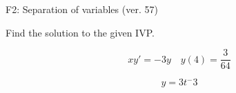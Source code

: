 \begin{exercise}
  \begin{exerciseTitle}F2: Separation of variables (ver. 57)\end{exerciseTitle}
  \begin{exerciseStatement}
    
Find the solution to the given IVP.

    
\[xy'= -3 y \hspace{1em} y( 4 ) = \frac{3}{64}\]

  \end{exerciseStatement}
  \begin{exerciseAnswer}
    
\[y= 3 t^ -3\]

  \end{exerciseAnswer}
\end{exercise}